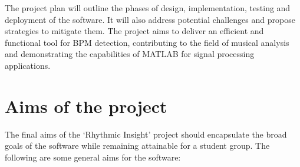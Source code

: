 \documentclass[a4paper,12pt,oneside]{article}
\begin{document}
The project plan will outline the phases of design, implementation,
testing and deployment of the software. It will also address potential
challenges and propose strategies to mitigate them. The project aims to
deliver an efficient and functional tool for BPM detection, contributing
to the field of musical analysis and demonstrating the capabilities of
MATLAB for signal processing applications.

\section{Aims of the project}

The final aims of the `Rhythmic Insight' project should encapsulate the
broad goals of the software while remaining attainable for a student
group. The following are some general aims for the software:
\end{document}
